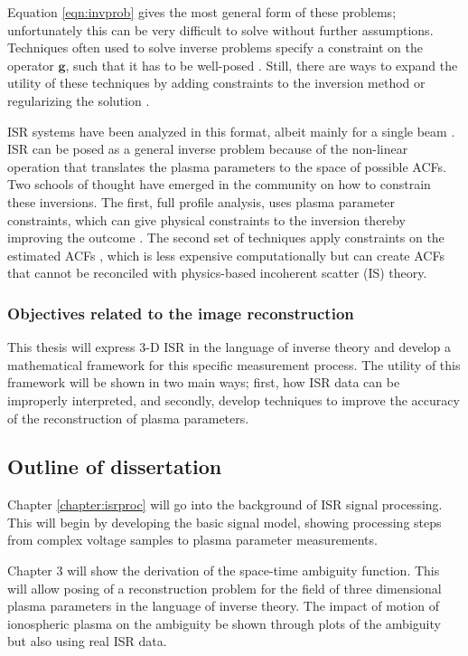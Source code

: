 Equation \ref{eqn:invprob} gives the most general form of these problems; unfortunately this can be very difficult to solve without further assumptions. Techniques often used to solve inverse problems specify a constraint on the operator $\mathbf{g}$, such that it has to be well-posed \citep{0266-5611-4-4-010}. Still, there are ways to expand the utility of these techniques by adding constraints to the inversion method or regularizing the solution \citep{Vogel:2002:CMI:581830,Karl:2005jy}.

ISR systems have been analyzed in this format, albeit mainly for a single beam \citep{Vierinen:2012ve}. ISR can be posed as a general inverse problem because of the non-linear operation that translates the plasma parameters to the space of possible ACFs. Two schools of thought have emerged in the community on how to constrain these inversions. The first, full profile analysis, uses plasma parameter constraints, which can give physical constraints to the inversion thereby improving the outcome \citep{hysell2008,RDS:RDS3308}. The second set of techniques apply constraints on the estimated ACFs \citep{Virtanen:20082vx,nikoukar2008}, which is less expensive computationally but can create ACFs that cannot be reconciled with physics-based incoherent scatter (IS) theory.

\subsubsection{Objectives related to the image reconstruction}
This thesis will express 3-D ISR in the language of inverse theory and develop a mathematical framework for this specific measurement process. The utility of this framework will be shown in two main ways; first, how ISR data can be improperly interpreted, and secondly, develop techniques to improve the accuracy of the reconstruction of plasma parameters.

\subsection{Outline of dissertation}

Chapter \ref{chapter:isrproc} will go into the background of ISR signal processing. This will begin by developing the basic signal model, showing processing steps from complex voltage samples to plasma parameter measurements.

Chapter 3 will show the derivation of the space-time ambiguity function. This will allow posing of a reconstruction problem for the field of three dimensional plasma parameters in the language of inverse theory. The impact of motion of ionospheric plasma on the ambiguity be shown through plots of the ambiguity but also using real ISR data.  

